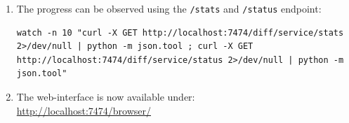 \begin{enumerate}
	\item The progress can be observed using the \texttt{/stats} and \texttt{/status} endpoint:
\begin{lstlisting}
watch -n 10 "curl -X GET http://localhost:7474/diff/service/stats 2>/dev/null | python -m json.tool ; curl -X GET http://localhost:7474/diff/service/status 2>/dev/null | python -m json.tool"
\end{lstlisting}

	\item The \neoj web-interface is now available under:\\ \url{http://localhost:7474/browser/}
\end{enumerate}


